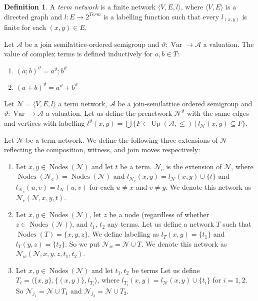 \documentclass[a4paper]{article}
\theoremstyle{definition}
\newtheorem{definition}{Definition}
\theoremstyle{theorem}
\theoremstyle{proposition}
\theoremstyle{lemma}
\theoremstyle{ex}
\theoremstyle{corollary}
\theoremstyle{claim}
\begin{document}
\begin{definition}
  A \emph{term network} is a finite network $\langle V, E, l \rangle$, where $\langle V, E \rangle$ is a directed graph and $l : E \to 2^{Term}$ is a labelling function such that every $l_(x,y)$ is finite for each $(x, y) \in E$.
\end{definition}

Let $\mathcal{A}$ be a join semilattice-ordered semigroup and $\vartheta : \operatorname{Var} \to \mathcal{A}$ a valuation. The value of complex terms is defined inductively for $a, b \in T$:

\begin{enumerate}
  \item $(a ; b)^{\vartheta} = a^{\vartheta} ; b^{\vartheta}$
  \item $(a + b)^{\vartheta} = a^{\vartheta} + b^{\vartheta}$
\end{enumerate}

Let $\mathcal{N} = \langle V, E, l \rangle$ a term network, $\mathcal{A}$ be a join-semilattice ordered semigroup and $\vartheta : \operatorname{Var} \to {\mathcal{A}}$ a valuation. Let us define the prenetwork $\mathcal{N}^{\vartheta}$ with the same edges and vertices with labelling $l^{\vartheta}(x, y) = \bigcup \{ F \in \operatorname{Up}(\mathcal{A}, \leq) \: | \: l_{\mathcal{N}}(x, y) \subseteq F \}$.

Let $\mathcal{N}$ be a term network. We define the following three extensions of $\mathcal{N}$ reflecting the composition, witness, and join moves respectively:
\begin{enumerate}
  \item Let $x, y \in \operatorname{Nodes}(\mathcal{N})$ and let $t$ be a term. $\mathcal{N}_c$ is the extension of $\mathcal{N}$,
  where $\operatorname{Nodes}(\mathcal{N}_c) = \operatorname{Nodes}(\mathcal{N})$ and $l_{\mathcal{N}_c}(x, y) = l_{\mathcal{N}}(x, y) \cup \{ t\}$ and $l_{\mathcal{N}_c}(u, v) = l_{\mathcal{N}}(u, v)$ for each $u \neq x$ and $v \neq y$. We denote this network as $\mathcal{N}_c(\mathcal{N}, x, y, t)$.
  \item
  Let $x, y \in \operatorname{Nodes}(\mathcal{N})$, let $z$ be a node (regardless of whether $z \in \operatorname{Nodes}(\mathcal{N})$), and $t_1$, $t_2$ any terms. Let us define a network $T$ such that $\operatorname{Nodes}(T) = \{ x, y, z\}$. We define labelling as $l_{T}(x, y) = \{ t_1 \}$ and $l_{T}(y, z) = \{ t_2 \}$. So we put $\mathcal{N}_w = \mathcal{N} \cup T$.
  We denote this network as $\mathcal{N}_w(\mathcal{N}, x,y,z, t_1, t_2)$.
  \item Let $x, y \in \operatorname{Nodes}(\mathcal{N})$ and let $t_1, t_2$ be terms
  Let us define $T_i = \langle \{ x, y\}, \{ (x, y) \}, l_{T_i} \rangle$, where $l_{T_i}(x, y) = l_{\mathcal{N}}(x, y) \cup \{ t_i \}$ for $i = 1,2$. So $\mathcal{N}_{j_1} = \mathcal{N} \cup T_1$ and $\mathcal{N}_{j_2} = \mathcal{N} \cup T_2$.
\end{enumerate}
\end{document}
